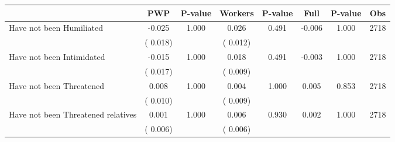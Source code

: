
\begin{tabular}{l*{7}{c}}\hline&\multicolumn{1}{c}{PWP}&\multicolumn{1}{c}{P-value}&\multicolumn{1}{c}{Workers}&\multicolumn{1}{c}{P-value}&\multicolumn{1}{c}{Full}&\multicolumn{1}{c}{P-value}&\multicolumn{1}{c}{Obs} \\ \hline

 Have not been Humiliated       &             -0.025       &        1.000  &              0.026       &        0.491  &             -0.006       &              1.000 &  2718 \\ 
                       &       (       0.018)             &                               &       (       0.012)                     &                               &                                               &                                &                      \\ 

 Have not been Intimidated       &             -0.015       &        1.000  &              0.018       &        0.491  &             -0.003       &              1.000 &  2718 \\ 
                       &       (       0.017)             &                               &       (       0.009)                     &                               &                                               &                                &                      \\ 

 Have not been Threatened       &              0.008       &        1.000  &              0.004       &        1.000  &              0.005       &              0.853 &  2718 \\ 
                       &       (       0.010)             &                               &       (       0.009)                     &                               &                                               &                                &                      \\ 

 Have not been Threatened relatives       &              0.001       &        1.000  &              0.006       &        0.930  &              0.002       &              1.000 &  2718 \\ 
                       &       (       0.006)             &                               &       (       0.006)                     &                               &                                               &                                &                      \\ 


\end{tabular}
